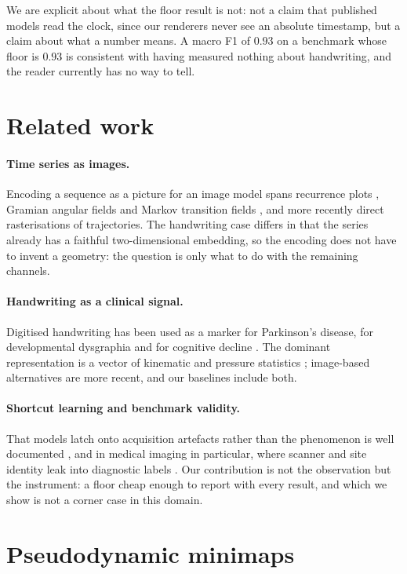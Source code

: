 \documentclass{article}
\begin{document}
We are explicit about what the floor result is not: not a claim that published models read the
clock, since our renderers never see an absolute timestamp, but a claim about what a number means.
A macro F1 of $0.93$ on a benchmark whose floor is $0.93$ is consistent with having measured nothing
about handwriting, and the reader currently has no way to tell.

\section{Related work}
\label{sec:related}

\paragraph{Time series as images.} Encoding a sequence as a picture for an image model spans
recurrence plots \citep{eckmann1987recurrence}, Gramian angular fields and
Markov transition fields \citep{wang2015gaf}, and more recently direct rasterisations of
trajectories. The handwriting case differs in that the series already has a faithful
two-dimensional embedding, so the encoding does not have to invent a geometry: the question is only
what to do with the remaining channels.

\paragraph{Handwriting as a clinical signal.} Digitised handwriting has been used as a marker for
Parkinson's disease, for developmental dysgraphia and for cognitive decline
\citep{werner2006handwriting}. The dominant representation is a vector of kinematic and pressure
statistics \citep{drotar2016pahaw,drotar2020dysgraphia}; image-based alternatives are more recent,
and our baselines include both.

\paragraph{Shortcut learning and benchmark validity.} That models latch onto acquisition artefacts
rather than the phenomenon is well documented \citep{geirhos2020shortcut}, and in medical imaging
in particular, where scanner and site identity leak into diagnostic labels
\citep{degrave2021shortcut}. Our contribution is not the observation but the instrument: a floor
cheap enough to report with every result, and which we show is not a corner case in this domain.

\section{Pseudodynamic minimaps}
\label{sec:method}
\end{document}
